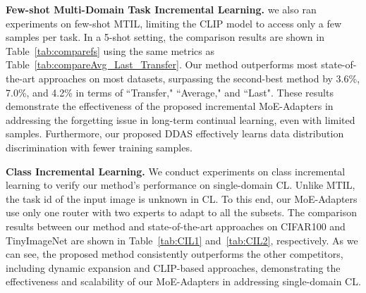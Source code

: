 \noindent\textbf{Few-shot Multi-Domain Task Incremental Learning.} 
we also ran experiments on few-shot MTIL, limiting the CLIP model to access only a few samples per task. In a 5-shot setting, the comparison results are shown in Table~\ref{tab:comparefs} using the same metrics as Table~\ref{tab:compareAvg_Last_Transfer}. Our method outperforms most state-of-the-art approaches on most datasets, surpassing the second-best method by 3.6\%, 7.0\%, and 4.2\% in terms of ``Transfer," ``Average," and ``Last". These results demonstrate the effectiveness of the proposed incremental MoE-Adapters in addressing the forgetting issue in long-term continual learning, even with limited samples. Furthermore, our proposed DDAS effectively learns data distribution discrimination with fewer training samples.

\noindent\textbf{Class Incremental Learning.}
We conduct experiments on class incremental learning to verify our method's performance on single-domain CL. Unlike MTIL, the task id of the input image is unknown in CL. To this end, our MoE-Adapters use only one router with two experts to adapt to all the subsets. The comparison results between our method and state-of-the-art approaches on CIFAR100 and TinyImageNet are shown in Table~\ref{tab:CIL1} and~\ref{tab:CIL2}, respectively. As we can see, the proposed method consistently outperforms the other competitors, including dynamic expansion and CLIP-based approaches, demonstrating the effectiveness and scalability of our MoE-Adapters in addressing single-domain CL. 

